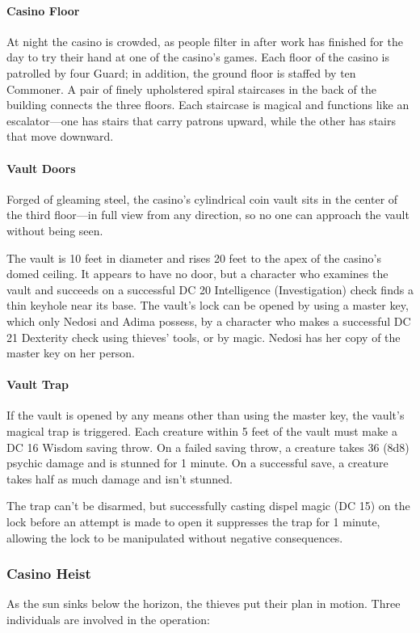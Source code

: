 \documentclass[10pt,a4paper,twoside,twocolumn,openany,nodeprecatedcode]{dndbook}
\begin{document}
\paragraph{Casino Floor}
At night the casino is crowded, as people filter in after work has finished for the day to try their hand at one of the casino's games. Each floor of the casino is patrolled by four Guard; in addition, the ground floor is staffed by ten Commoner. A pair of finely upholstered spiral staircases in the back of the building connects the three floors. Each staircase is magical and functions like an escalator—one has stairs that carry patrons upward, while the other has stairs that move downward.

\paragraph{Vault Doors}
Forged of gleaming steel, the casino's cylindrical coin vault sits in the center of the third floor—in full view from any direction, so no one can approach the vault without being seen.

The vault is 10 feet in diameter and rises 20 feet to the apex of the casino's domed ceiling. It appears to have no door, but a character who examines the vault and succeeds on a successful DC 20 Intelligence (Investigation) check finds a thin keyhole near its base. The vault's lock can be opened by using a master key, which only Nedosi and Adima possess, by a character who makes a successful DC 21 Dexterity check using thieves' tools, or by magic. Nedosi has her copy of the master key on her person.

\paragraph{Vault Trap}
If the vault is opened by any means other than using the master key, the vault's magical trap is triggered. Each creature within 5 feet of the vault must make a DC 16 Wisdom saving throw. On a failed saving throw, a creature takes 36 (8d8) psychic damage and is stunned for 1 minute. On a successful save, a creature takes half as much damage and isn't stunned.

The trap can't be disarmed, but successfully casting dispel magic (DC 15) on the lock before an attempt is made to open it suppresses the trap for 1 minute, allowing the lock to be manipulated without negative consequences.

\subsubsection{Casino Heist}
As the sun sinks below the horizon, the thieves put their plan in motion. Three individuals are involved in the operation:
\end{document}

